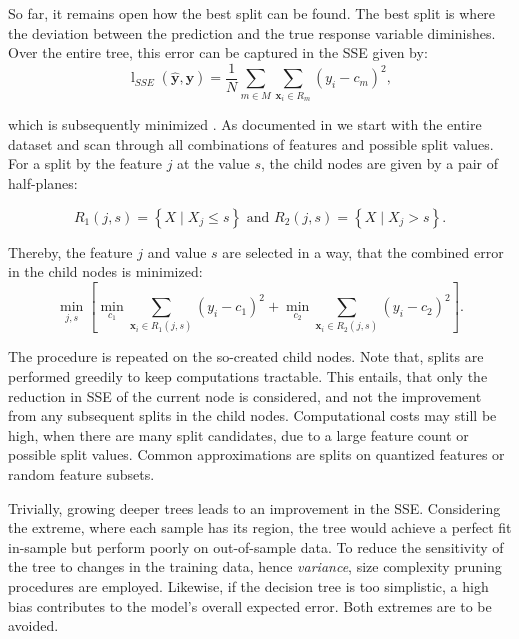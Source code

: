 So far, it remains open how the best split can be found. The best split is where the deviation between the prediction and the true response variable diminishes. Over the entire tree, this error can be captured in the \gls{SSE} given by:
\begin{equation}
    \operatorname{l}_{SSE}(\widehat{\boldsymbol{y}},\boldsymbol{y})=\frac{1}{N} \sum_{m \in M} \sum_{\boldsymbol{x}_{i} \in R_m}\left(y_{i}-c_{m}\right)^{2},
\end{equation}

which is subsequently minimized \textcite[][231]{breimanClassificationRegressionTrees2017}. As documented in \textcite[][326]{hastietrevorElementsStatisticalLearning2009} we start with the entire dataset and scan through all combinations of features and possible split values. For a split by the feature $j$ at the value $s$, the child nodes are given by a pair of half-planes:

\begin{equation}
    R_1(j, s)=\left\{X \mid X_j \leq s\right\} \text { and } R_2(j, s)=\left\{X \mid X_j>s\right\}.
\end{equation}

Thereby, the feature $j$ and value $s$ are selected in a way, that the combined error in the child nodes is minimized:
\begin{equation}
    \min _{j, s}\left[\min _{c_1} \sum_{\boldsymbol{x}_i \in R_1(j, s)}\left(y_i-c_1\right)^2+\min _{c_2} \sum_{\boldsymbol{x}_i \in R_2(j, s)}\left(y_i-c_2\right)^2\right].
\end{equation}

The procedure is repeated on the so-created child nodes. Note that, splits are performed greedily to keep computations tractable. This entails, that only the reduction in \gls{SSE} of the current node is considered, and not the improvement from any subsequent splits in the child nodes. Computational costs may still be high, when there are many split candidates, due to a large feature count or possible split values. Common approximations are splits on quantized features or random feature subsets.

Trivially, growing deeper trees leads to an improvement in the \gls{SSE}. Considering the extreme, where each sample has its region, the tree would achieve a perfect fit in-sample but perform poorly on out-of-sample data. To reduce the sensitivity of the tree to changes in the training data, hence \emph{variance}, size complexity pruning procedures are employed. Likewise, if the decision tree is too simplistic, a high bias contributes to the model's overall expected error. Both extremes are to be avoided.

